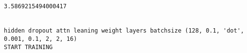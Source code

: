 \documentclass[11pt]{article}
\begin{document}
    \begin{center}
    \end{center}
    { \hspace*{\fill} \\}
    
    \begin{center}
    \end{center}
    { \hspace*{\fill} \\}
    
    \begin{center}
    \end{center}
    { \hspace*{\fill} \\}
    
    \begin{center}
    \end{center}
    { \hspace*{\fill} \\}
    
    \begin{Verbatim}[commandchars=\\\{\}]
3.5869215494000417


hidden dropout attn leaning weight layers batchsize (128, 0.1, 'dot', 0.001, 0.1, 2, 2, 16)
START TRAINING



    \end{Verbatim}

    \begin{center}
    \end{center}
    { \hspace*{\fill} \\}
    
    \begin{center}
    \end{center}
    { \hspace*{\fill} \\}
    
    \begin{center}
    \end{center}
    { \hspace*{\fill} \\}
    
\end{document}

